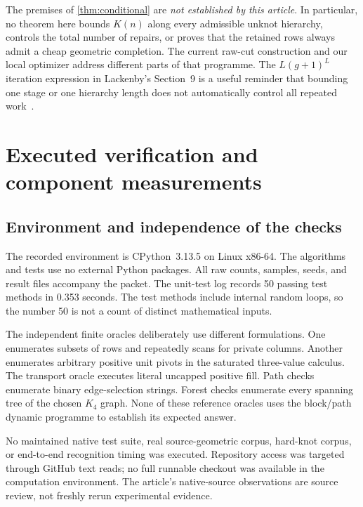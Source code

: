 \documentclass[11pt,letterpaper]{article}
\theoremstyle{definition}
\theoremstyle{remark}
\begin{document}
The premises of \cref{thm:conditional} are \emph{not established by this article}. In particular, no theorem here bounds $K(n)$ along every admissible unknot hierarchy, controls the total number of repairs, or proves that the retained rows always admit a cheap geometric completion. The current raw-cut construction and our local optimizer address different parts of that programme. The $L(g+1)^L$ iteration expression in Lackenby's Section~9 is a useful reminder that bounding one stage or one hierarchy length does not automatically control all repeated work~\cite{lackenby2026}.

\section{Executed verification and component measurements}
\label{sec:experiments}

\subsection{Environment and independence of the checks}
The recorded environment is CPython~3.13.5 on Linux x86-64. The algorithms and tests use no external Python packages. All raw counts, samples, seeds, and result files accompany the packet. The unit-test log records 50 passing test methods in 0.353 seconds. The test methods include internal random loops, so the number 50 is not a count of distinct mathematical inputs.

The independent finite oracles deliberately use different formulations. One enumerates subsets of rows and repeatedly scans for private columns. Another enumerates arbitrary positive unit pivots in the saturated three-value calculus. The transport oracle executes literal uncapped positive fill. Path checks enumerate binary edge-selection strings. Forest checks enumerate every spanning tree of the chosen $K_4$ graph. None of these reference oracles uses the block/path dynamic programme to establish its expected answer.

No maintained native test suite, real source-geometric corpus, hard-knot corpus, or end-to-end recognition timing was executed. Repository access was targeted through GitHub text reads; no full runnable checkout was available in the computation environment. The article's native-source observations are source review, not freshly rerun experimental evidence.
\end{document}

